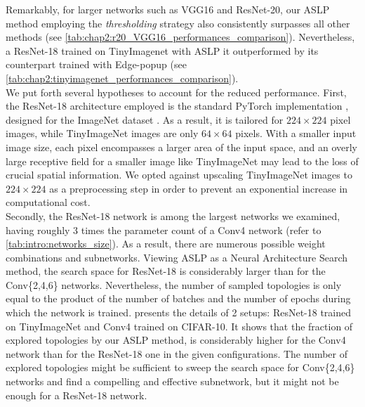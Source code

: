Remarkably, for larger networks such as VGG16 and ResNet-20, our \ac{ASLP} method
employing the \textit{thresholding} strategy also consistently surpasses all
other methods (see \cref{tab:chap2:r20_VGG16_performances_comparison}).
Nevertheless, a ResNet-18 trained on TinyImagenet with \ac{ASLP} it outperformed by
its counterpart trained with Edge-popup (see
\cref{tab:chap2:tinyimagenet_performances_comparison}).\\

We put forth several hypotheses to account for the reduced performance. First,
the ResNet-18 architecture employed is the standard PyTorch implementation
\cite{pytorch_resnet18}, designed for the ImageNet dataset
\cite{deng2009imagenet}. As a result, it is tailored for $224 \times 224$ pixel
images, while TinyImageNet images are only $64 \times 64$ pixels. With a smaller
input image size, each pixel encompasses a larger area of the input space, and
an overly large receptive field for a smaller image like TinyImageNet may lead
to the loss of crucial spatial information. We opted against upscaling
TinyImageNet images to $224 \times 224$ as a preprocessing step in order to
prevent an exponential increase in computational cost.\\

Secondly, the ResNet-18 network is among the largest networks we examined,
having roughly 3 times the parameter count of a Conv4 network (refer to
\cref{tab:intro:networks_size}). As a result, there are numerous possible weight
combinations and subnetworks. Viewing \ac{ASLP} as a Neural Architecture Search
method, the search space for ResNet-18 is considerably larger than for the
Conv\{2,4,6\} networks. Nevertheless, the number of sampled topologies is only
equal to the product of the number of batches and the number of epochs during
which the network is trained.  presents
the details of 2 setups: ResNet-18 trained on TinyImageNet and Conv4 trained on
CIFAR-10. It shows that the fraction of explored topologies by our \ac{ASLP}
method, is considerably higher for the Conv4 network than for the ResNet-18 one
in the given configurations. The number of explored topologies might be
sufficient to sweep the search space for Conv\{2,4,6\} networks and find a
compelling and effective subnetwork, but it might not be enough for a ResNet-18
network.\\

